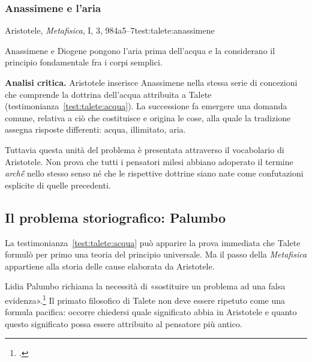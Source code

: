 \subsubsection{Anassimene e l'aria}

\begin{testimonianza}{Aristotele, \emph{Metafisica}, I, 3, 984a5--7}{test:talete:anassimene}
\smallskip
{}\par
Anassimene e Diogene pongono l'aria prima dell'acqua e la considerano il principio fondamentale fra i corpi semplici.
\end{testimonianza}


\noindent\textbf{Analisi critica.}
Aristotele inserisce Anassimene nella stessa serie di concezioni che comprende la dottrina dell'acqua attribuita a Talete (testimonianza~\ref{test:talete:acqua}). La successione fa emergere una domanda comune, relativa a ciò che costituisce e origina le cose, alla quale la tradizione assegna risposte differenti: acqua, illimitato, aria.

Tuttavia questa unità del problema è presentata attraverso il vocabolario di Aristotele. Non prova che tutti i pensatori milesi abbiano adoperato il termine \emph{archḗ} nello stesso senso né che le rispettive dottrine siano nate come confutazioni esplicite di quelle precedenti.

\subsection{Il problema storiografico: Palumbo}

La testimonianza~\ref{test:talete:acqua} può apparire la prova immediata che Talete formulò per primo una teoria del principio universale. Ma il passo della \emph{Metafisica} appartiene alla storia delle cause elaborata da Aristotele.

Lidia Palumbo richiama la necessità di «sostituire un problema ad una falsa evidenza».\footnote{\cite[18]{palumbo2015}.} Il primato filosofico di Talete non deve essere ripetuto come una formula pacifica: occorre chiedersi quale significato abbia in Aristotele e quanto questo significato possa essere attribuito al pensatore più antico.

